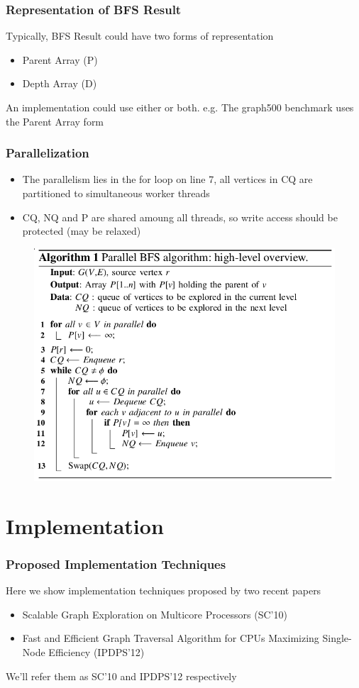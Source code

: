 \documentclass[]{beamer}
\begin{document}
\begin{frame}
  \frametitle{Representation of BFS Result}
  Typically, BFS Result could have two forms of representation
  \begin{itemize}
    \item Parent Array (P)
    \item Depth Array (D)
  \end{itemize}
  An implementation could use either or both. e.g. The graph500 benchmark
  uses the Parent Array form
\end{frame}

\begin{frame}
  \frametitle{Parallelization}
  \begin{itemize}
    \item The parallelism lies in the for loop on line 7, all vertices in CQ
      are partitioned to simultaneous worker threads
    \item CQ, NQ and P are shared amoung all threads, so write access should be
      protected (may be relaxed)
  \end{itemize}
  \begin{figure}
    \centering
    \includegraphics[width=.5\textwidth]{figures/bfs-serial}
  \end{figure}
\end{frame}

\section{Implementation}
\frame{\tableofcontents[currentsection]}

\begin{frame}
  \frametitle{Proposed Implementation Techniques}
  Here we show implementation techniques proposed by two recent papers
  \begin{itemize}
    \item Scalable Graph Exploration on Multicore Processors\cite{Agarwal2010} (SC'10)
    \item Fast and Efficient Graph Traversal Algorithm for CPUs Maximizing Single-Node
      Efficiency\cite{Chhugani2012} (IPDPS'12)
  \end{itemize}
  We'll refer them as SC'10 and IPDPS'12 respectively
\end{frame}
\end{document}
